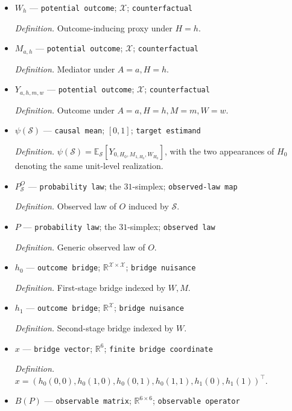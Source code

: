\documentclass{article}
\begin{document}
\begin{itemize}
  \par\smallskip\noindent\emph{Definition.} Treatment-inducing proxy under \(A=a,H=h\).
  \item \(W_h\) --- \texttt{potential outcome}; \(\mathcal X\); \texttt{counterfactual}
  \par\smallskip\noindent\emph{Definition.} Outcome-inducing proxy under \(H=h\).
  \item \(M_{a,h}\) --- \texttt{potential outcome}; \(\mathcal X\); \texttt{counterfactual}
  \par\smallskip\noindent\emph{Definition.} Mediator under \(A=a,H=h\).
  \item \(Y_{a,h,m,w}\) --- \texttt{potential outcome}; \(\mathcal X\); \texttt{counterfactual}
  \par\smallskip\noindent\emph{Definition.} Outcome under \(A=a,H=h,M=m,W=w\).
  \item \(\psi(\mathcal S)\) --- \texttt{causal mean}; \([0,1]\); \texttt{target estimand}
  \par\smallskip\noindent\emph{Definition.} \(\psi(\mathcal S)=\mathbb E_{\mathcal S}[Y_{0,H_0,M_{1,H_0},W_{H_0}}]\), with the two appearances of \(H_0\) denoting the same unit-level realization.
  \item \(P_{\mathcal S}^O\) --- \texttt{probability law}; the \(31\)-simplex; \texttt{observed-\allowbreak{}law map}
  \par\smallskip\noindent\emph{Definition.} Observed law of \(O\) induced by \(\mathcal S\).
  \item \(P\) --- \texttt{probability law}; the \(31\)-simplex; \texttt{observed law}
  \par\smallskip\noindent\emph{Definition.} Generic observed law of \(O\).
  \item \(h_0\) --- \texttt{outcome bridge}; \(\mathbb R^{\mathcal X\times\mathcal X}\); \texttt{bridge nuisance}
  \par\smallskip\noindent\emph{Definition.} First-stage bridge indexed by \(W,M\).
  \item \(h_1\) --- \texttt{outcome bridge}; \(\mathbb R^{\mathcal X}\); \texttt{bridge nuisance}
  \par\smallskip\noindent\emph{Definition.} Second-stage bridge indexed by \(W\).
  \item \(x\) --- \texttt{bridge vector}; \(\mathbb R^6\); \texttt{finite bridge coordinate}
  \par\smallskip\noindent\emph{Definition.} \(x=(h_0(0,0),h_0(1,0),h_0(0,1),h_0(1,1),h_1(0),h_1(1))^{\top}\).
  \item \(B(P)\) --- \texttt{observable matrix}; \(\mathbb R^{6\times6}\); \texttt{observable operator}

\end{itemize}
\end{document}
